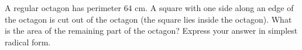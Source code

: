A regular octagon has perimeter $64$ cm. A square with one side along an edge of the octagon is cut out of the octagon (the square lies inside the octagon). What is the area of the remaining part of the octagon? Express your answer in simplest radical form.
